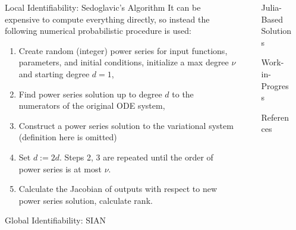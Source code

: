 \documentclass[final]{beamer}
\newlength{\sepwidth}
\newlength{\colwidth}
\newcommand{\separatorcolumn}{\begin{column}{\sepwidth}\end{column}}
\begin{document}
\begin{frame}[t]
\begin{columns}[t]
\begin{column}{\colwidth}
\begin{block}{Local Identifiability: Sedoglavic's Algorithm}
        It can be expensive to compute everything directly, so instead the following numerical probabilistic procedure is used:
        \begin{enumerate}
          \item Create random (integer) power series for input functions, parameters, and initial conditions, initialize a max degree \(\nu\) and starting degree \(d=1\),
          \item Find power series solution up to degree \(d\) to the numerators of the original ODE system,
          \item Construct a power series solution to the variational system (definition here is omitted)
          \item Set \(d:=2d\). Steps 2, 3 are repeated until the order of power series is at most \(\nu\).
          \item Calculate the Jacobian of outputs with respect to new power series solution, calculate rank.
        \end{enumerate}

      \end{block}

      \begin{block}{Global Identifiability: SIAN}

      \end{block}

    \end{column}

    \separatorcolumn

    \begin{column}{\colwidth}

      \begin{block}{Julia-Based Solutions}



      \end{block}

      \begin{block}{Work-in-Progress}

      \end{block}

      \begin{block}{References}
        \printbibliography{}
      \end{block}
    \end{column}
    \separatorcolumn{}
  \end{columns}
\end{frame}
\end{document}
